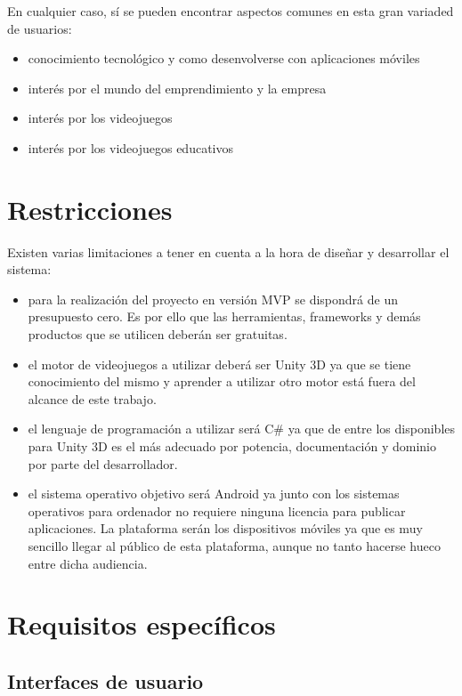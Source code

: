 En cualquier caso, sí se pueden encontrar aspectos comunes en esta gran variaded de usuarios:

\begin{itemize}

\item conocimiento tecnológico y como desenvolverse con aplicaciones móviles
\item interés por el mundo del emprendimiento y la empresa
\item interés por los videojuegos
\item interés por los videojuegos educativos

\end{itemize}

\section{Restricciones}

Existen varias limitaciones a tener en cuenta a la hora de diseñar y desarrollar el sistema:

\begin{itemize}

\item para la realización del proyecto en versión MVP se dispondrá de un presupuesto cero. Es por ello que las herramientas, frameworks y demás productos que se utilicen deberán ser gratuitas.
\item el motor de videojuegos a utilizar deberá ser Unity 3D ya que se tiene conocimiento del mismo y aprender a utilizar otro motor está fuera del alcance de este trabajo.
\item el lenguaje de programación a utilizar será C\# ya que de entre los disponibles para Unity 3D es el más adecuado por potencia, documentación y dominio por parte del desarrollador.
\item el sistema operativo objetivo será Android ya junto con los sistemas operativos para ordenador no requiere ninguna licencia para publicar aplicaciones. La plataforma serán los dispositivos móviles ya que es muy sencillo llegar al público de esta plataforma, aunque no tanto hacerse hueco entre dicha audiencia.

\end{itemize}

\section{Requisitos específicos}

\subsection{Interfaces de usuario}

